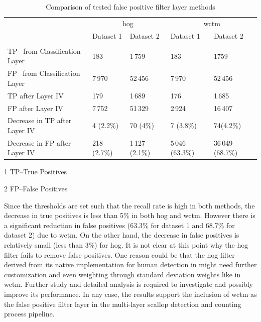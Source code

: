 \documentclass {udthesis}
\begin{document}
\begin{table}
  \centering
  \begin{threeparttable}
    \begin{tabular}{lllll}
\toprule[1pt]
	&\multicolumn{2}{c}{\gls{hog}}	&\multicolumn{2}{c}{\gls{wctm}}\\
	&Dataset 1	&Dataset 2	&Dataset 1	&Dataset 2\\ [2pt]\cline{1-5}\\[-5pt]
TP\tnote{1} ~from Classification Layer	&183		&1\,759		&183		&1759\\
FP\tnote{2} ~from Classification Layer	&7\,970		&52\,456		&7\,970		&52\,456\\
TP after Layer IV 			&179		&1\,689		&176		&1\,685\\
FP after Layer IV 			&7\,752		&51\,329		&2\,924		&16\,407\\
Decrease in TP after Layer IV	&4 (2.2\%)	&70 (4\%)	&7 (3.8\%)	&74(4.2\%)\\
Decrease in FP after Layer IV	&218 (2.7\%)	&1\,127 (2.1\%)	&5\,046 (63.3\%)	&36\,049 (68.7\%)\\ \bottomrule
    \end{tabular}
    \begin{tablenotes}
	  \item[1] \footnotesize{TP--True Positives}
	  \item[2] \footnotesize{FP--False Positives}
    \end{tablenotes}                                                      
  \end{threeparttable}
  \caption{Comparison of tested false positive filter layer methods}
  \label{tab:false_positives}
\end{table}      
%
Since the thresholds are set such that the recall rate is high in both methods, the decrease in true positives is less than 5\% in both \gls{hog} and \gls{wctm}. 
However there is a significant reduction in false positives (63.3\% for dataset 1 and 68.7\% for dataset 2)  due to \gls{wctm}. 
On the other hand, the decrease in false positives is relatively small (less than 3\%) for \gls{hog}.
It is not clear at this point why the \gls{hog} filter fails to remove  false positives. 
One reason could be that the \gls{hog} filter derived from its native implementation for human detection in \cite{dalal} might need further customization and even weighting through standard deviation weights like in \gls{wctm}. 
Further study and detailed analysis is required to investigate and possibly improve its performance. 
In any case, the results support the inclusion of \gls{wctm} as the false positive filter layer in the multi-layer scallop detection and counting process pipeline.
\end{document}
